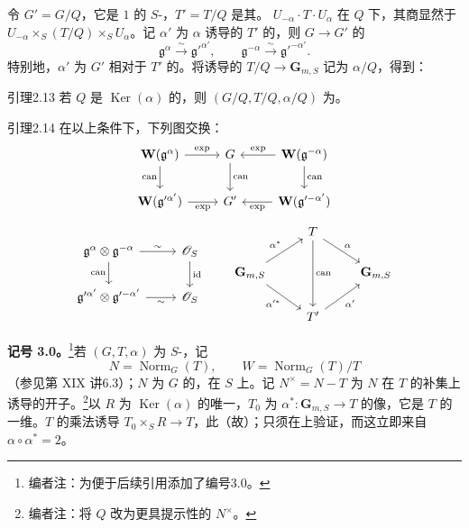 令 $G'=G/Q$，它是 $1$ 的 $S$-，$T'=T/Q$ 是其。 $U_{-\alpha}\cdot T\cdot U_\alpha$ 在 $Q$ 下，其商显然于 $U_{-\alpha}\times_S(T/Q)\times_SU_\alpha$。记 $\alpha'$ 为 $\alpha$ 诱导的 $T'$ 的，则 $G\to G'$ 的
\[\mathfrak g^\alpha\xrightarrow\sim\mathfrak g'^{\alpha'},\qquad\mathfrak g^{-\alpha}\xrightarrow\sim\mathfrak g'^{-\alpha'}.\]
特别地，$\alpha'$ 为 $G'$ 相对于 $T'$ 的。将诱导的 $T/Q\to\mathbf G_{m,S}$ 记为 $\alpha/Q$，得到：
\begin{SGAresult}{引理}{2.13}
若 $Q$ 是 $\operatorname{Ker}(\alpha)$ 的，则 $(G/Q,T/Q,\alpha/Q)$ 为。
\end{SGAresult}
\begin{SGAresult}{引理}{2.14}
在以上条件下，下列图交换：
\[\begin{tikzcd}\mathbf W(\mathfrak g^\alpha)\arrow[r,"\exp"]\arrow[d,"\mathrm{can}"']&G\arrow[d,"\mathrm{can}"]&\mathbf W(\mathfrak g^{-\alpha})\arrow[l,"\exp"']\arrow[d,"\mathrm{can}"]\\\mathbf W(\mathfrak g'^{\alpha'})\arrow[r,"\exp"']&G'&\mathbf W(\mathfrak g'^{-\alpha'})\arrow[l,"\exp"]\end{tikzcd}\]
\[\begin{tikzcd}\mathfrak g^\alpha\otimes\mathfrak g^{-\alpha}\arrow[r,"\sim"]\arrow[d,"\mathrm{can}"']&\mathscr O_S\arrow[d,"\mathrm{id}"]\\\mathfrak g'^{\alpha'}\otimes\mathfrak g'^{-\alpha'}\arrow[r,"\sim"']&\mathscr O_S\end{tikzcd}\qquad\begin{tikzcd}&T\arrow[dr,"\alpha"]\arrow[dd,"\mathrm{can}"]&\\\mathbf G_{m,S}\arrow[ur,"\alpha^*"]\arrow[dr,"\alpha'^*"']&&\mathbf G_{m,S}\\&T'\arrow[ur,"\alpha'"']&\end{tikzcd}\]
\end{SGAresult}
\textbf{记号 3.0。}\footnote{编者注：为便于后续引用添加了编号3.0。}若 $(G,T,\alpha)$ 为 $S$-，记
\[N=\operatorname{Norm}_G(T),\qquad W=\operatorname{Norm}_G(T)/T\]
（参见第 XIX 讲6.3）；$N$ 为 $G$ 的，在 $S$ 上。记 $N^\times=N-T$ 为 $N$ 在 $T$ 的补集上诱导的开子。\footnote{编者注：将 $Q$ 改为更具提示性的 $N^\times$。}以 $R$ 为 $\operatorname{Ker}(\alpha)$ 的唯一，$T_0$ 为 $\alpha^*:\mathbf G_{m,S}\to T$ 的像，它是 $T$ 的一维。$T$ 的乘法诱导 $T_0\times_SR\to T$，此（故）；只须在上验证，而这立即来自 $\alpha\circ\alpha^*=2$。
